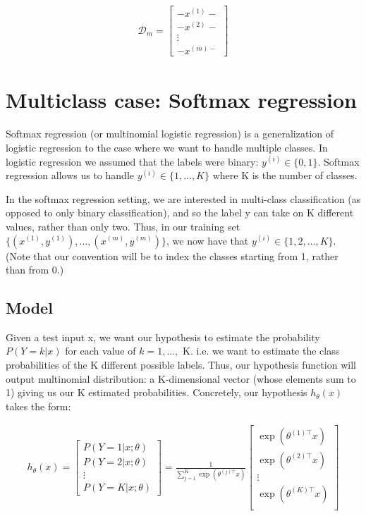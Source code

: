 \begin{align}
	\mathcal{D}_m = 
	\left[
		\begin{array}{cccc}
			- x^{(1)} - \\
			- x^{(2)} -  \\ 
			\vdots \\
			- x^{(m) - } 
		\end{array}
	\right]
\end{align}










\section{Multiclass case: Softmax regression}


Softmax regression (or multinomial logistic regression) is a generalization of logistic regression to the case where we want to handle multiple classes. In logistic regression we assumed that the labels were binary: $y^{(i)} \in \{0,1\}$. Softmax regression allows us to handle $ y^{(i)} \in \{1,\ldots,K\}$ where K is the number of classes.

In the softmax regression setting, we are interested in multi-class classification (as opposed to only binary classification), and so the label y can take on K different values, rather than only two. Thus, in our training set $\{ (x^{(1)}, y^{(1)}), \ldots, (x^{(m)}, y^{(m)}) \}$, we now have that $y^{(i)} \in \{1, 2, \ldots, K\}$. (Note that our convention will be to index the classes starting from 1, rather than from 0.) 

\subsection{Model}

Given a test input x, we want our hypothesis to estimate the probability $P(Y=k | x)$ for each value of $k = 1, \ldots,$ K. i.e. we want to estimate the class probabilities of the K different possible labels. Thus, our hypothesis function will output multinomial distribution: a K-dimensional vector (whose elements sum to 1) giving us our K estimated probabilities. Concretely, our hypothesis $h_{\theta}(x)$ takes the form:

\begin{align}
	h_\theta(x)
	=
	\begin{bmatrix}
		P(Y = 1 | x; \theta) \\ P(Y = 2 | x; \theta) \\ \vdots \\ P(Y = K | x; \theta) 
	\end{bmatrix} 
	= 
	\frac{1}{ \sum_{j=1}^{K}{\exp(\theta^{(j)\top} x) }} 
	\begin{bmatrix} 
		\exp(\theta^{(1)\top} x ) \\ \exp(\theta^{(2)\top} x ) \\ \vdots \\ \exp(\theta^{(K)\top} x ) \\ 
	\end{bmatrix} 
\end{align}


